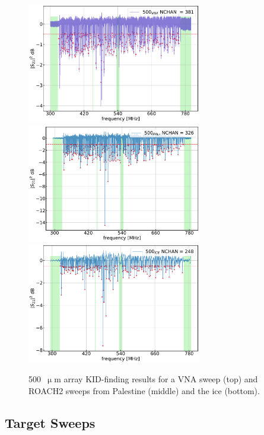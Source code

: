 \begin{figure}[!p]
\centering
\caption[~ array KID-finding results.]{500~$\upmu$m array KID-finding results for a VNA sweep (top) and ROACH2 sweeps from Palestine (middle) and the ice (bottom).}
\includegraphics[width=0.68\textwidth]{figures/blast_data/sweeps/500_May2018VNA_FK}
\includegraphics[width=0.68\textwidth]{figures/blast_data/sweeps/500_PAL_FK}
\includegraphics[width=0.68\textwidth]{figures/blast_data/sweeps/500_ICE_FK}
\label{fig:500 VNA FK}
\end{figure}

\subsection{Target Sweeps}\label{target sweeps}

